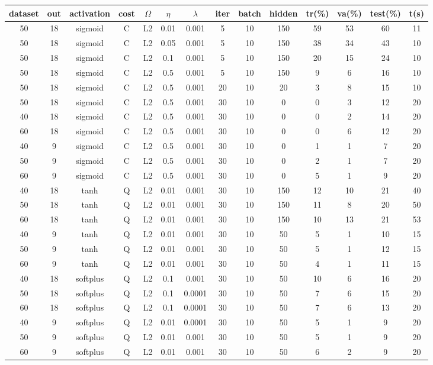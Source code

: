 \documentclass[11pt]{article}
\begin{document}
\begin{table}[h]
  \centering

\begin{tabular}{|c|c|c|c|c|c|c|c|c|c|c|c|c|c|}
  \hline
  dataset & out & activation  & cost & $\Omega$ & $\eta$ & $\lambda$ & iter  & batch & hidden & tr(\%) & va(\%) & test(\%) & t(s)\\
  \hline
	50 & 18 & sigmoid & C & L2 & 0.01 & 0.001 & 5 & 10 & 150 & 59 & 53 & 60 & 11 \\
  \hline
	50 & 18 & sigmoid & C & L2 & 0.05 & 0.001 & 5 & 10 & 150 & 38 & 34 & 43  & 10\\
  \hline
	50	& 18 & sigmoid & C & L2 & 0.1 & 0.001 & 5 & 10 & 150 & 20 & 15 & 24  & 10\\
  \hline
	50	& 18 & sigmoid & C & L2 & 0.5 & 0.001 & 5 & 10 & 150 & 9 & 6 & 16  & 10 \\
  \hline
	50	& 18 & sigmoid & C & L2 & 0.5 & 0.001 & 20 & 10 & 20 & 3 & 8 & 15 & 10 \\
  \hline
	50	& 18 & sigmoid & C & L2 & 0.5 & 0.001 & 30 & 10 & 0 & 0 & 3 & 12 & 20 \\
  \hline
  \rowcolor{green}
	40	& 18 & sigmoid & C & L2 & 0.5 & 0.001 & 30 & 10 & 0 & 0 & 2 & 14 & 20 \\
  \hline
	60	& 18 & sigmoid & C & L2 & 0.5 & 0.001 & 30 & 10 & 0 & 0 & 6 & 12 & 20 \\
  \hline
  \rowcolor{green}
	40	& 9 & sigmoid & C & L2 & 0.5 & 0.001 & 30 & 10 & 0 & 1 & 1 & 7 & 20 \\
   \hline
	50	& 9 & sigmoid & C & L2 & 0.5 & 0.001 & 30 & 10 & 0 & 2 & 1 & 7 & 20 \\
   \hline
	60	& 9 & sigmoid & C & L2 & 0.5 & 0.001 & 30 & 10 & 0 & 5 & 1 & 9 & 20 \\
	\hline
	40	& 18 & tanh & Q & L2 & 0.01 & 0.001 & 30 & 10 & 150 & 12 & 10 & 21 & 40 \\
	\hline
	50	& 18 & tanh & Q & L2 & 0.01 & 0.001 & 30 & 10 & 150 & 11 & 8 & 20  & 50\\
\hline
	60	& 18 & tanh & Q & L2 & 0.01 & 0.001 & 30 & 10 & 150 & 10 & 13 & 21  & 53\\
\hline
	40	& 9 & tanh & Q & L2 & 0.01 & 0.001 & 30 & 10 & 50 & 5 & 1 & 10  & 15\\
	\hline
	50	& 9 & tanh & Q & L2 & 0.01 & 0.001 & 30 & 10 & 50 & 5 & 1 & 12  & 15\\
\hline
	60	& 9 & tanh & Q & L2 & 0.01 & 0.001 & 30 & 10 & 50 & 4 & 1 & 11  & 15\\
\hline
	40	& 18 & softplus & Q & L2 & 0.1 & 0.001 & 30 & 10 & 50 & 10 & 6 & 16  & 20\\
	\hline
	50	& 18 & softplus & Q & L2 & 0.1 & 0.0001 & 30 & 10 & 50 & 7 & 6 & 15  & 20\\
\hline
	60	& 18 & softplus & Q & L2 & 0.1 & 0.0001 & 30 & 10 & 50 & 7 & 6 & 13  & 20\\
\hline
	40	& 9 & softplus & Q & L2 & 0.01 & 0.0001 & 30 & 10 & 50 & 5 & 1 & 9  & 20\\
	\hline
	50	& 9 & softplus & Q & L2 & 0.01 & 0.001 & 30 & 10 & 50 & 5 & 1 & 9  & 20\\
\hline
	60	& 9 & softplus & Q & L2 & 0.01 & 0.001 & 30 & 10 & 50 & 6 & 2 & 9  & 20\\


\end{tabular}
\end{table}
\end{document}
